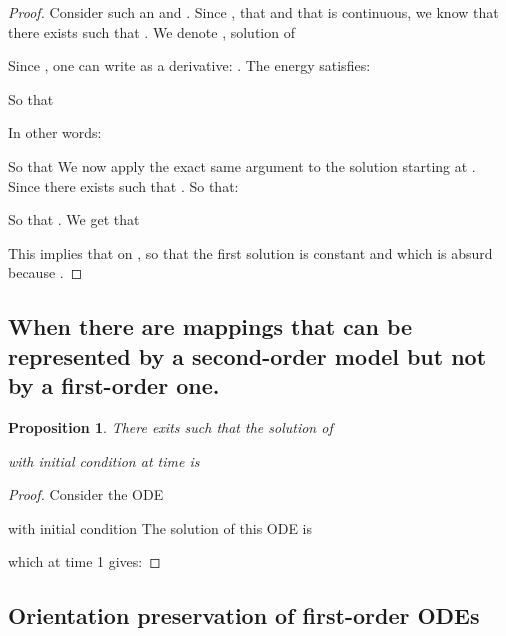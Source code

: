 \documentclass{article}
\newtheorem{proposition}{Proposition}
\begin{document}
 \begin{proof}
 Consider such an  and . Since , that  and that  is continuous, we know that there exists  such that .
We denote , solution of 


Since , one can write  as a derivative: . 
The energy  satisfies: 

So that 

In other words: 

So that 
We now apply the exact same argument to the solution starting at . Since  there exists  such that . So that:

So that .
We get that 

This implies that  on , so that the first solution is constant and  which is absurd because .
\end{proof}
\subsection{When  there are mappings that can be represented by a second-order model but not by a first-order one.}\label{app:prop_lambda}

\begin{proposition}\label{prop:lambda}
There exits  such that the solution of 

with initial condition 
at time  is

\end{proposition}

\begin{proof}
Consider the ODE

with initial condition 
The solution of this ODE is 

which at time 1 gives:

\end{proof}

\subsection{Orientation preservation of first-order ODEs}\label{app:prop_connected}
\end{document}

